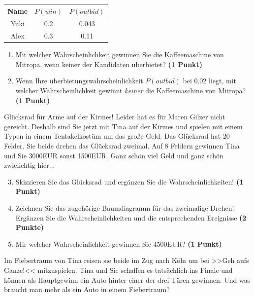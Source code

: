 \documentclass[a4paper, 9pt]{scrartcl}\usepackage[]{graphicx}\usepackage[]{xcolor}
\begin{document}
\begin{center}
\begin{tabular}{ccc}
  \toprule
  Name & $P(win)$ & $P(outbid)$\\
  \midrule
  Yuki & 0.2 & 0.043\\
  Alex & 0.3 & 0.11 \\
  \bottomrule
\end{tabular}
\end{center}

\begin{enumerate}
\item Mit welcher Wahrscheinlichkeit gewinnen Sie die Kaffeemaschine von Mitropa, wenn keiner der Kandidaten überbietet? \textbf{(1 Punkt)}
\item Wenn Ihre überbietungswahrscheinlichkeit $P(outbid)$ bei 0.02 liegt, mit welcher Wahrscheinlichkeit gewinnt \textit{keiner} die Kaffeemaschine von Mitropa? \textbf{(1 Punkt)}
\end{enumerate}

Glücksrad für Arme auf der Kirmes! Leider hat es für Maren Gilzer nicht gereicht. Deshalb sind Sie jetzt mit Tina auf der Kirmes und spielen mit einem Typen in einem Tentakelkostüm um das große Geld. Das Glücksrad hat 20 Felder. Sie beide drehen das Glücksrad zweimal. Auf 8 Feldern gewinnen Tina und Sie 3000EUR sonst 1500EUR. Ganz schön viel Geld und ganz schön zwielichtig hier...

\begin{enumerate}
  \setcounter{enumi}{2}  
\item Skizzieren Sie das Glücksrad und ergänzen Sie die Wahrscheinlichkeiten! \textbf{(1 Punkt)}
\item Zeichnen Sie das zugehörige Baumdiagramm für das zweimalige Drehen! Ergänzen Sie die Wahrscheinlichkeiten und die entsprechenden Ereignisse \textbf{(2 Punkte)}
\item Mir welcher Wahrscheinlichkeit gewinnen Sie 4500EUR? \textbf{(1 Punkt)}
\end{enumerate}

Im Fiebertraum von Tina reisen sie beide im Zug nach Köln um bei >>Geh aufs Ganze!<< mitzuspielen. Tina und Sie schaffen es tatsächlich ins Finale und können als Hauptgewinn ein Auto hinter einer der drei Türen gewinnen. Und was braucht man mehr als ein Auto in einem Fiebertraum? 
\end{document}
